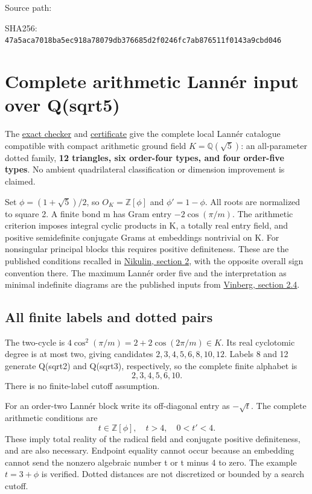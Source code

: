 \documentclass[
  10pt,
]{report}
\begin{document}
Source path: 

SHA256:
\nolinkurl{47a5aca7018ba5ec918a78079db376685d2f0246fc7ab876511f0143a9cbd046}

\chapter{Complete arithmetic Lannér input over
Q(sqrt5)}\label{complete-arithmetic-lannuxe9r-input-over-qsqrt5}

The \href{../scripts/fresh_sqrt5_lanner_catalogue_20261015.py}{exact
checker} and
\href{fresh_sqrt5_lanner_catalogue_20261015.json}{certificate} give the
complete local Lannér catalogue compatible with compact arithmetic
ground field \(K=\mathbb Q(\sqrt5)\): an all-parameter dotted family,
\textbf{12 triangles, six order-four types, and four order-five types}.
No ambient quadrilateral classification or dimension improvement is
claimed.

Set \(\phi=(1+\sqrt5)/2\), so \(O_K=\mathbb Z[\phi]\) and
\(\phi'=1-\phi\). All roots are normalized to square 2. A finite bond m
has Gram entry \(-2\cos(\pi/m)\). The arithmetic criterion imposes
integral cyclic products in K, a totally real entry field, and positive
semidefinite conjugate Grams at embeddings nontrivial on K. For
nonsingular principal blocks this requires positive definiteness. These
are the published conditions recalled in
\href{https://arxiv.org/pdf/0708.3991}{Nikulin, section 2}, with the
opposite overall sign convention there. The maximum Lannér order five
and the interpretation as minimal indefinite diagrams are the published
inputs from
\href{https://www.mathnet.ru/php/getFT.phtml?jrnid=mmo&option_lang=rus&paperid=444&what=fullt}{Vinberg,
section 2.4}.

\section{All finite labels and dotted
pairs}\label{all-finite-labels-and-dotted-pairs}

The two-cycle is \(4\cos^2(\pi/m)=2+2\cos(2\pi/m)\in K\). Its real
cyclotomic degree is at most two, giving candidates
\(2,3,4,5,6,8,10,12\). Labels 8 and 12 generate Q(sqrt2) and Q(sqrt3),
respectively, so the complete finite alphabet is \[
\boxed{2,3,4,5,6,10}.
\] There is no finite-label cutoff assumption.

For an order-two Lannér block write its off-diagonal entry as
\(-\sqrt t\). The complete arithmetic conditions are \[
\boxed{t\in\mathbb Z[\phi],\quad t>4,\quad 0<t'<4.}
\] These imply total reality of the radical field and conjugate positive
definiteness, and are also necessary. Endpoint equality cannot occur
because an embedding cannot send the nonzero algebraic number t or t
minus 4 to zero. The example \(t=3+\phi\) is verified. Dotted distances
are not discretized or bounded by a search cutoff.
\end{document}
